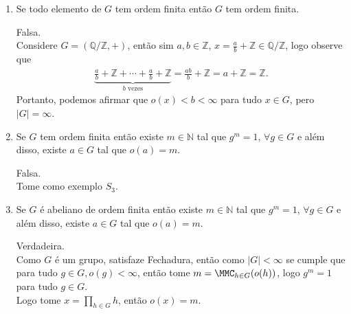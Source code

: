 \begin{homeworkProblem}
\begin{solution}
\begin{enumerate}
        Verdadeira.\\
        Como $x$ e $y$ são elementos de orden finita que comutam en $G$, suponha que $o(x)=h$ e $o(y)=k$, então $o(xy)=\MMC(h,k)$ dado que 
        \begin{align*}
          \underbrace{xy*xy*\cdots*xy}_{\MMC(h,k)\text{ vezes}}&=(\underbrace{x*x*\cdots*x}_{\MMC(h,k) \text{ vezes}})*(\underbrace{y*y*\cdots*y}_{\MMC(h,k) \text{ vezes}})\\
          &=1*1\\
          &=1.
        \end{align*}
      \item Se todo elemento de $G$ tem ordem finita então $G$ tem ordem finita.

      Falsa.\\
      Considere $G=(\mathbb{Q}/\mathbb{Z},+)$, então sim $a,b\in \mathbb{Z}$, $x=\frac{a}{b}+\mathbb{Z}\in \mathbb{Q}/\mathbb{Z}$, logo observe que
      \begin{align*}
        \underbrace{\frac{a}{b}+\mathbb{Z}+\cdots+\frac{a}{b}+\mathbb{Z}}_{b\text{ vezes}}=\frac{ab}{b}+\mathbb{Z}=a+\mathbb{Z}=\mathbb{Z}. 
      \end{align*}
      Portanto, podemos afirmar que $o(x)<b<\infty$ para tudo $x\in G$, pero $|G|=\infty$.
      \item Se $G$ tem ordem finita então existe $m \in \mathbb{N}$ tal que $g^m = 1$, $\forall g \in G$ e além disso, existe $a \in G$ tal que $o(a)=m$.

        Falsa.\\
        Tome como exemplo $S_3$. 
      \item Se $G$ é abeliano de ordem finita então existe $m \in \mathbb{N}$ tal que $g^m = 1$, $\forall g \in G$ e além disso, existe $a \in G$ tal que $o(a)=m$.

      Verdadeira.\\
      Como $G$ é um grupo, satisfaze Fechadura, então como $|G|<\infty$ se cumple que para tudo $g\in G, o(g)<\infty$, então tome $\displaystyle m=\MMC_{h\in G}(o(h))$, logo $g^{m}=1$ para tudo $g\in G$.\\
      Logo tome $\displaystyle x=\prod_{h\in G}h$, então $o(x)=m$.
    \end{enumerate}
  \end{solution}
\end{homeworkProblem}
